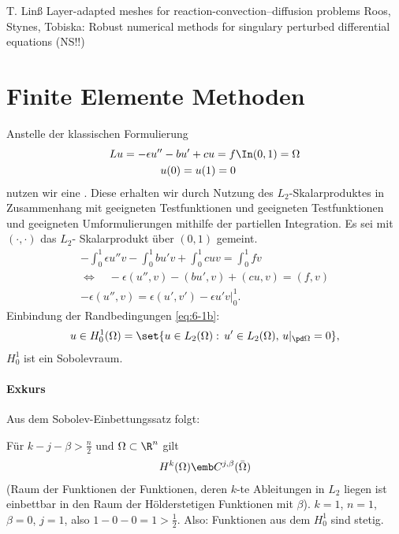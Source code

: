 
 T. Linß Layer-adapted meshes for reaction-convection--diffusion problems
Roos, Stynes, Tobiska: Robust numerical methods for singulary perturbed differential equations (NS!!)

\section{Finite Elemente Methoden}
\label{sec:finite-elem-meth}

Anstelle der klassischen Formulierung
\begin{subequations}
  \label{eq:6-1}
\begin{align}
  Lu = - \epsilon u'' - b u' + cu = f &\In (0, 1) = \Omega \label{eq:6-1a}\\
u(0) = u(1) = 0 & \label{eq:6-1b}
\end{align}
\end{subequations}
nutzen wir eine . Diese erhalten wir durch Nutzung des $L_{2}$-Skalarproduktes in Zusammenhang mit geeigneten Testfunktionen und geeigneten Testfunktionen und geeigneten Umformulierungen mithilfe der partiellen Integration. Es sei mit $(\cdot, \cdot)$ das $L_{2}$- Skalarprodukt über $(0, 1)$ gemeint. 
\begin{align*}
  - \int_{0}^{1} \epsilon u'' v - \int_{0}^{1} b u' v + \int_{0}^{1} cuv = \int_{0}^{1} fv\\
\iff \quad - \epsilon (u'', v) - (bu', v) + (cu, v) = (f, v) \\
- \epsilon (u'', v) = \epsilon (u', v') - \epsilon u'v|_{0}^{1}. 
\end{align*}
Einbindung der Randbedingungen \eqref{eq:6-1b}:
\begin{align*}
  u \in H_{0}^{1}(\Omega) = \set{u \in L_{2}(\Omega): \, u'\in L_{2}(\Omega), \, u|_{\pd \Omega} = 0},  
\end{align*}
$H_{0}^{1}$ ist ein Sobolevraum.

\paragraph{Exkurs}
Aus dem Sobolev-Einbettungssatz folgt: 

Für $k-j-\beta > \frac n2$ und $\Omega \subset \R^{n}$ gilt
\begin{align*}
  H^{k}(\Omega) \emb C^{j, \beta}(\bar \Omega)
\end{align*}
(Raum der Funktionen der Funktionen, deren $k$-te Ableitungen in $L_{2}$ liegen ist einbettbar in den Raum der Hölderstetigen Funktionen mit $\beta$). $k =1$, $n = 1$, $\beta = 0$, $j = 1$, also $1 - 0- 0 = 1 > \frac 12$. 
Also: Funktionen aus dem $H_{0}^{1}$ sind stetig. 

